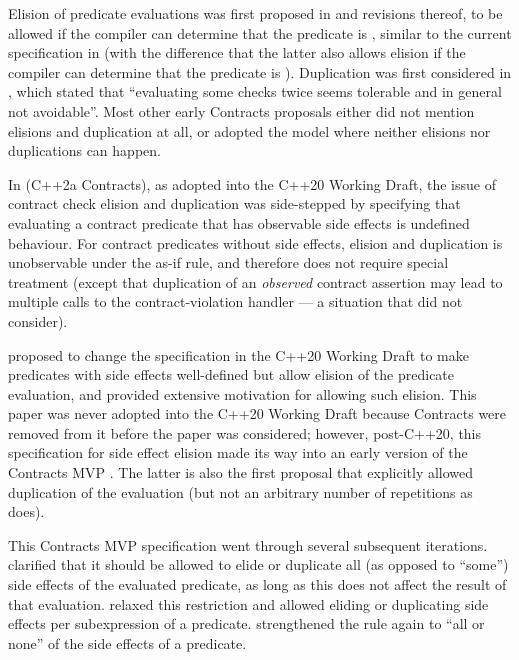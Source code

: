 Elision of predicate evaluations was first proposed in \cite{N1669} and revisions thereof, to be allowed if the compiler can determine that the predicate is , similar to the current specification in \cite{P2900R6} (with the difference that the latter also allows elision if the compiler can determine that the predicate is ). Duplication was first considered in \cite{P0247R0}, which stated that ``evaluating some checks twice seems tolerable and in general not avoidable''. Most other early Contracts proposals either did not mention elisions and duplication at all, or adopted the  model where neither elisions nor duplications can happen.

In \cite{P0542R5} (C++2a Contracts), as adopted into the C++20 Working Draft, the issue of contract check elision and duplication was side-stepped by specifying that evaluating a contract predicate that has observable side effects is undefined behaviour. For contract predicates without side effects, elision and duplication is unobservable under the as-if rule, and therefore does not require special treatment (except that duplication of an \emph{observed} contract assertion may lead to multiple calls to the contract-violation handler --- a situation that \cite{P0542R5} did not consider).

\cite{P1670R0} proposed to change the specification in the C++20 Working Draft to make predicates with side effects well-defined but allow elision of the predicate evaluation, and provided extensive motivation for allowing such elision. This paper was never adopted into the C++20 Working Draft because Contracts were removed from it before the paper was considered; however, post-C++20, this specification for side effect elision made its way into an early version of the Contracts MVP \cite{P2388R4}. The latter is also the first proposal that explicitly allowed duplication of the evaluation (but not an arbitrary number of repetitions as \cite{P2900R6} does).

This Contracts MVP specification went through several subsequent iterations. \cite{P2388R0} clarified that it should be allowed to elide or duplicate all (as opposed to ``some'') side effects of the evaluated predicate, as long as this does not affect the result of that evaluation. \cite{P2388R3} relaxed this restriction and allowed eliding or duplicating side effects per subexpression of a predicate. \cite{P2521R5} strengthened the rule again to ``all or none'' of the side effects of a predicate.

